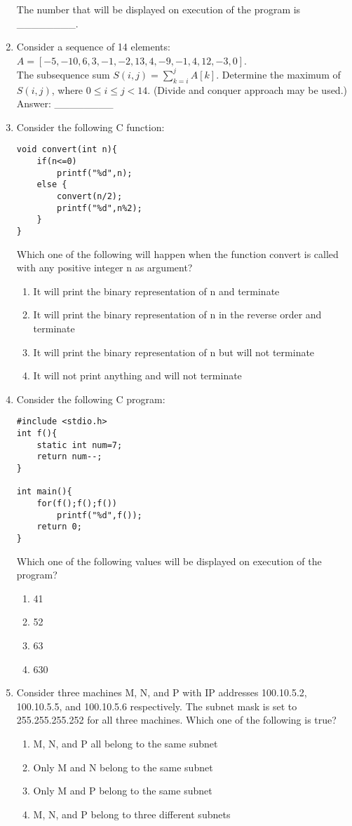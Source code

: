 \documentclass[12pt]{article}
\begin{document}
\begin{enumerate}[label=Q.\arabic*]
The number that will be displayed on execution of the program is \_\_\_\_\_\_\_\_.

\item Consider a sequence of 14 elements: $A = [-5, -10, 6, 3, -1, -2, 13, 4, -9, -1, 4, 12, -3, 0]$. \\
The subsequence sum $S(i,j) = \sum_{k=i}^{j} A[k]$. Determine the maximum of $S(i,j)$, where $0 \leq i \leq j < 14$. (Divide and conquer approach may be used.) \\
Answer: \_\_\_\_\_\_\_\_

\item Consider the following C function:
\begin{verbatim}
void convert(int n){
    if(n<=0)
        printf("%d",n);
    else {
        convert(n/2);
        printf("%d",n%2);
    }
}
\end{verbatim}
Which one of the following will happen when the function convert is called with any positive integer n as argument?
\begin{enumerate}[label=(\Alph*)]
\item It will print the binary representation of n and terminate
\item It will print the binary representation of n in the reverse order and terminate
\item It will print the binary representation of n but will not terminate
\item It will not print anything and will not terminate
\end{enumerate}

\item Consider the following C program:
\begin{verbatim}
#include <stdio.h>
int f(){
    static int num=7;
    return num--;
}

int main(){
    for(f();f();f())
        printf("%d",f());
    return 0;
}
\end{verbatim}
Which one of the following values will be displayed on execution of the program?
\begin{enumerate}[label=(\Alph*)]
\item 41
\item 52
\item 63
\item 630
\end{enumerate}

\item Consider three machines M, N, and P with IP addresses 100.10.5.2, 100.10.5.5, and 100.10.5.6 respectively. The subnet mask is set to 255.255.255.252 for all three machines. Which one of the following is true?
\begin{enumerate}[label=(\Alph*)]
\item M, N, and P all belong to the same subnet
\item Only M and N belong to the same subnet
\item Only M and P belong to the same subnet
\item M, N, and P belong to three different subnets
\end{enumerate}


\end{enumerate}
\end{document}
